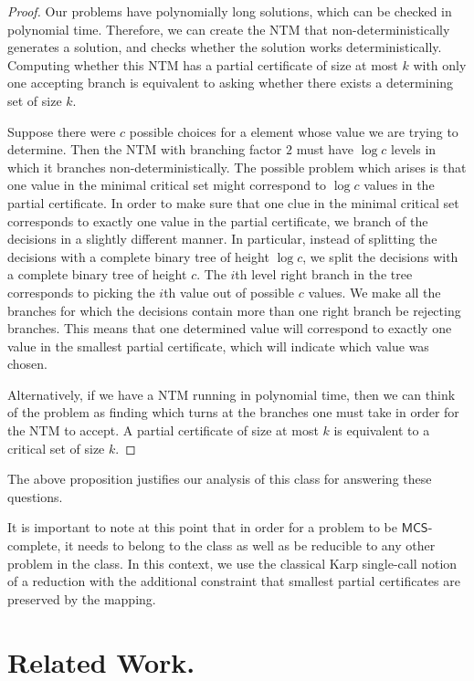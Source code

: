 \documentclass[runningheads,a4paper]{llncs}
\begin{document}
\begin{proof}
Our problems have polynomially long solutions, which can be checked in polynomial time. Therefore, we can create the NTM that non-deterministically generates a solution, and checks whether the solution works deterministically. Computing whether this NTM has a partial certificate of size at most $k$ with only one accepting branch is equivalent to asking whether there exists a determining set of size $k$. 

Suppose there were $c$ possible choices for a element whose value we are trying to determine. Then the NTM with branching factor $2$ must have $\log c$ levels in which it branches non-deterministically. The possible problem which arises is that one value in the minimal critical set might correspond to $\log c$ values in the partial certificate. In order to make sure that one clue in the minimal critical set corresponds to exactly one value in the partial certificate, we branch of the decisions in a slightly different manner. In particular, instead of splitting the decisions with a complete binary tree of height $\log c$, we split the decisions with a complete binary tree of height $c$. The $i$th level right branch in the tree corresponds to picking the $i$th value out of possible $c$ values. We make all the branches for which the decisions contain more than one right branch be rejecting branches. This means that one determined value will correspond to exactly one value in the smallest partial certificate, which will indicate which value was chosen.

Alternatively, if we have a NTM running in polynomial time, then we can think of the problem as finding which turns at the branches one must take in order for the NTM to accept. A partial certificate of size at most $k$ is equivalent to a critical set of size $k$.
\end{proof}

The above proposition justifies our analysis of this class for answering these questions.

It is important to note at this point that in order for a problem to be $\mathsf{MCS}$-complete, it needs to belong to the class as well as be reducible to any other problem in the class. In this context, we use the classical Karp single-call notion of a reduction with the additional constraint that smallest partial certificates are preserved by the mapping.

\section{Related Work.}
\end{document}
